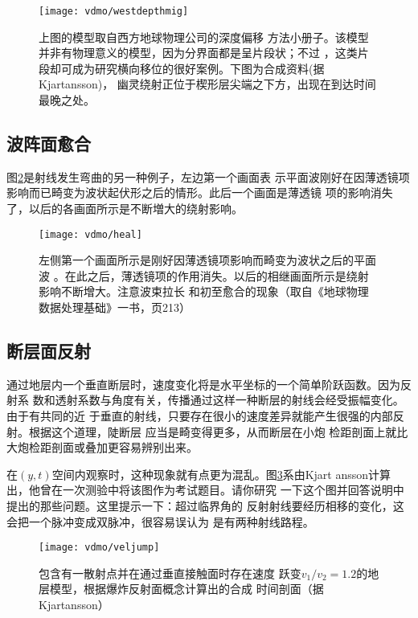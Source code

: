 \begin{figure}[H]
\centering
\texttt{[image: vdmo/westdepthmig]}
\caption[westdepthmig]{上图的模型取自西方地球物理公司的深度偏移
方法小册子。该模型并非有物理意义的模型，因为分界面都是呈片段状；不过
，这类片段却可成为研究横向移位的很好案例。下图为合成资料(据Kjartansson)，
幽灵绕射正位于楔形层尖端之下方，出现在到达时间最晚之处。}
\label{fig:vdmo/westdepthmig}
\end{figure}


\subsection{波阵面愈合}
\label{sec:3.7.4}

图\ref{fig:vdmo/heal}是射线发生弯曲的另一种例子，左边第一个画面表
示平面波刚好在因薄透镜项影响而已畸变为波状起伏形之后的情形。此后一个画面是薄透镜
项的影响消失了，以后的各画面所示是不断増大的绕射影响。

\begin{figure}[H]
\centering
\texttt{[image: vdmo/heal]}
\caption[heal]{左侧第一个画面所示是刚好因薄透镜项影响而畸变为波状之后的平面波
。在此之后，薄透镜项的作用消失。以后的相继画面所示是绕射影响不断增大。注意波束拉长
和初至愈合的现象（取自《地球物理数据处理基础》一书，页213）}
\label{fig:vdmo/heal}
\end{figure}

\subsection{断层面反射}
\label{sec:3.7.5}

通过地层内一个垂直断层时，速度变化将是水平坐标的一个简单阶跃函数。因为反射系
数和透射系数与角度有关，传播通过这样一种断层的射线会经受振幅变化。由于有共同的近
于垂直的射线，只要存在很小的速度差异就能产生很强的内部反射。根据这个道理，陡断层
应当是畸变得更多，从而断层在小炮
检距剖面上就比大炮检距剖面或叠加更容易辨别出来。

在$(y,t)$空间内观察时，这种现象就有点更为混乱。图\ref{fig:vdmo/veljump}系由Kjart
ansson计算出，他曾在一次测验中将该图作为考试题目。请你研究
一下这个图并回答说明中提出的那些问题。这里提示一下：超过临界角的
反射射线要经历相移的变化，这会把一个脉冲变成双脉冲，很容易误认为
是有两种射线路程。

\begin{figure}[H]
\centering
\texttt{[image: vdmo/veljump]}
\caption[veljump]{包含有一散射点并在通过垂直接触面时存在速度
跃变$v_1/v_2=1.2$的地层模型，根据爆炸反射面概念计算出的合成
时间剖面（据Kjartansson）}
\label{fig:vdmo/veljump}
\end{figure}


